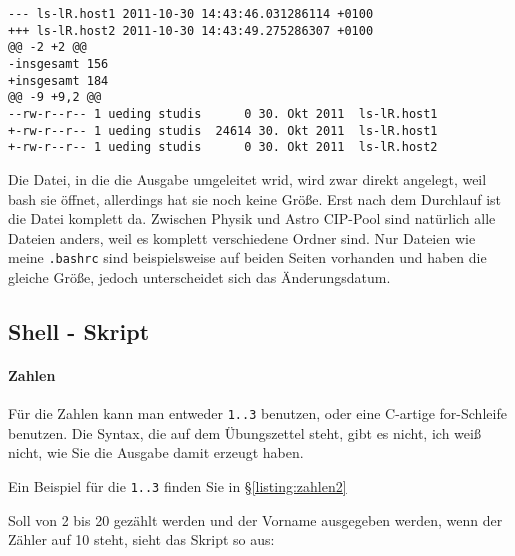 \documentclass[12pt]{article}
\begin{document}
\begin{lstlisting}[caption=Unterschied zwischen Ordnerinhalten]
--- ls-lR.host1 2011-10-30 14:43:46.031286114 +0100
+++ ls-lR.host2 2011-10-30 14:43:49.275286307 +0100
@@ -2 +2 @@
-insgesamt 156
+insgesamt 184
@@ -9 +9,2 @@
--rw-r--r-- 1 ueding studis      0 30. Okt 2011  ls-lR.host1
+-rw-r--r-- 1 ueding studis  24614 30. Okt 2011  ls-lR.host1
+-rw-r--r-- 1 ueding studis      0 30. Okt 2011  ls-lR.host2
\end{lstlisting}

Die Datei, in die die Ausgabe umgeleitet wrid, wird zwar direkt angelegt, weil bash sie öffnet, allerdings hat sie noch keine Größe. Erst nach dem Durchlauf ist die Datei komplett da. Zwischen Physik und Astro CIP-Pool sind natürlich alle Dateien anders, weil es komplett verschiedene Ordner sind. Nur Dateien wie meine \texttt{.bashrc} sind beispielsweise auf beiden Seiten vorhanden und haben die gleiche Größe, jedoch unterscheidet sich das Änderungsdatum.

\subsection{Shell - Skript}

\lstset{language=bash}





\paragraph{Zahlen}

Für die Zahlen kann man entweder \texttt{{1..3}} benutzen, oder eine C-artige for-Schleife benutzen. Die Syntax, die auf dem Übungszettel steht, gibt es nicht, ich weiß nicht, wie Sie die Ausgabe damit erzeugt haben.

\lstset{language=bash}




Ein Beispiel für die \texttt{{1..3}} finden Sie in §\ref{listing:zahlen2}

Soll von 2 bis 20 gezählt werden und der Vorname ausgegeben werden, wenn der Zähler auf 10 steht, sieht das Skript so aus:


\lstset{language=bash}

\end{document}
